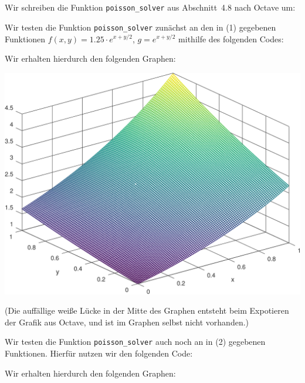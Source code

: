 \section{}

Wir schreiben die Funktion \texttt{poisson\_solver} aus Abschnitt~4.8 nach Octave um:



Wir testen die Funktion \texttt{poisson\_solver} zunächst an den in (1) gegebenen Funktionen $f(x,y) = 1.25 \cdot e^{x + y/2}$, $g = e^{x + y/2}$ mithilfe des folgenden Codes:



Wir erhalten hierdurch den folgenden Graphen:

\begin{center}
  \includegraphics[width = \textwidth]{chapter_08/exercise_08_42_figure_1.pdf}
\end{center}

(Die auffällige weiße Lücke in der Mitte des Graphen entsteht beim Expotieren der Grafik aus Octave, und ist im Graphen selbst nicht vorhanden.)

Wir testen die Funktion \texttt{poisson\_solver} auch noch an in (2) gegebenen Funktionen.
Hierfür nutzen wir den folgenden Code:



Wir erhalten hierdurch den folgenden Graphen:

